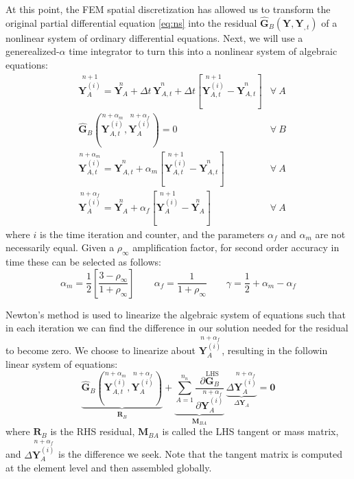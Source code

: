 \documentclass{ucb}
\begin{document}
At this point, the FEM spatial discretization has allowed us to transform the original partial differential equation \eqref{eq:ns} into the residual $\bm{\hat{G}}_B(\bm{Y},\bm{Y}_{,t})$ of a nonlinear system of ordinary differential equations. Next, we will use a generealized-$\alpha$ time integrator to turn this into a nonlinear system of algebraic equations:
\begin{subequations}
    \begin{align}
        &\overset{n+1}{\bm{Y}_A^{(i)}} = \overset{n}{\bm{Y}_A} + \Delta t \, \overset{n}{\bm{Y}_{A,t}} + \Delta t \left[\overset{n+1}{\bm{Y}_{A,t}^{(i)}} - \overset{n}{\bm{Y}_{A,t}}\right] &\forall \ A
        \label{eq:od1}
        \\
        &\bm{\hat{G}}_B\left(\overset{n+\alpha_m}{\bm{Y}_{A,t}^{(i)}}, \overset{n+\alpha_f}{\bm{Y}_A^{(i)}}\right) = 0 &\forall \ B
        \label{eq:od2}
        \\
        &\overset{n+\alpha_m}{\bm{Y}_{A,t}^{(i)}} = \overset{n}{\bm{Y}_{A,t}} + \alpha_m \left[\overset{n+1}{\bm{Y}_{A,t}^{(i)}} - \overset{n}{\bm{Y}_{A,t}}\right] &\forall \ A
        \label{eq:od3}
        \\
        &\overset{n+\alpha_f}{\bm{Y}_A^{(i)}} = \overset{n}{\bm{Y}_A} + \alpha_f \left[\overset{n+1}{\bm{Y}_A^{(i)}} -  \overset{n}{\bm{Y}_A}\right] &\forall \ A
        \label{eq:od4}
    \end{align}
\end{subequations}
where $i$ is the time iteration and counter, and the parameters $\alpha_f$ and $\alpha_m$ are not necessarily equal. Given a $\rho_\infty$ amplification factor, for second order accuracy in time these can be selected as follows:
\begin{equation}
    \alpha_m = \frac{1}{2}\left[\frac{3 - \rho_\infty}{1 + \rho_\infty}\right] \qquad
    \alpha_f = \frac{1}{1 + \rho_\infty} \qquad
    \gamma = \frac{1}{2} + \alpha_m - \alpha_f
\end{equation}

Newton's method is used to linearize the algebraic system of equations such that in each iteration we can find the difference in our solution needed for the residual to become zero. We choose to linearize about $\overset{n+\alpha_f}{\bm{Y}_A^{(i)}}$, resulting in the followin linear system of equations:
\begin{equation}
    \underbrace{\bm{\hat{G}}_B\left(\overset{n+\alpha_m}{\bm{Y}_{A,t}^{(i)}}, \overset{n+\alpha_f}{\bm{Y}_A^{(i)}}\right)}_{\bm{R}_B} + \underbrace{\sum_{A = 1}^{n_n} \frac{\partial\overset{\mathrm{LHS}}{\bm{G}_B}}{\partial\overset{n+\alpha_f}{\bm{Y}_A^{(i)}}}}_{\bm{M}_{BA}}\,\underbrace{\Delta\overset{n+\alpha_f}{\bm{Y}_A^{(i)}}}_{\Delta\bm{Y}_A} = \bm{0}
    \label{eq:newton}
\end{equation}
where $\bm{R}_B$ is the RHS residual, $\bm{M}_{BA}$ is called the LHS tangent or mass matrix, and $\Delta\overset{n+\alpha_f}{\bm{Y}_A^{(i)}}$ is the difference we seek. Note that the tangent matrix is computed at the element level and then assembled globally.
\end{document}
